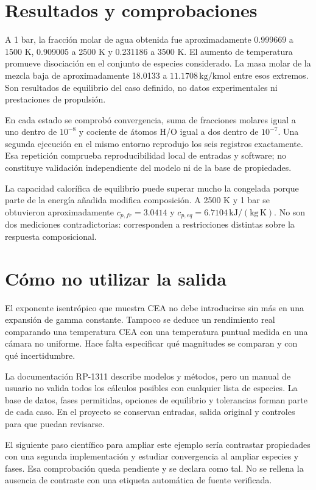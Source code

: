 \section{Resultados y comprobaciones}
A 1 bar, la fracción molar de agua obtenida fue aproximadamente 0.999669 a 1500 K, 0.909005 a 2500 K y 0.231186 a 3500 K. El aumento de temperatura promueve disociación en el conjunto de especies considerado. La masa molar de la mezcla baja de aproximadamente 18.0133 a $11.1708\,\mathrm{kg/kmol}$ entre esos extremos. Son resultados de equilibrio del caso definido, no datos experimentales ni prestaciones de propulsión.

En cada estado se comprobó convergencia, suma de fracciones molares igual a uno dentro de $10^{-8}$ y cociente de átomos H/O igual a dos dentro de $10^{-7}$. Una segunda ejecución en el mismo entorno reprodujo los seis registros exactamente. Esa repetición comprueba reproducibilidad local de entradas y software; no constituye validación independiente del modelo ni de la base de propiedades.

La capacidad calorífica de equilibrio puede superar mucho la congelada porque parte de la energía añadida modifica composición. A 2500 K y 1 bar se obtuvieron aproximadamente $c_{p,fr}=3.0414$ y $c_{p,eq}=6.7104\,\mathrm{kJ/(kg\,K)}$. No son dos mediciones contradictorias: corresponden a restricciones distintas sobre la respuesta composicional.
\section{Cómo no utilizar la salida}
El exponente isentrópico que muestra CEA no debe introducirse sin más en una expansión de gamma constante. Tampoco se deduce un rendimiento real comparando una temperatura CEA con una temperatura puntual medida en una cámara no uniforme. Hace falta especificar qué magnitudes se comparan y con qué incertidumbre.

La documentación RP-1311 describe modelos y métodos, pero un manual de usuario no valida todos los cálculos posibles con cualquier lista de especies. La base de datos, fases permitidas, opciones de equilibrio y tolerancias forman parte de cada caso. En el proyecto se conservan entradas, salida original y controles para que puedan revisarse.

El siguiente paso científico para ampliar este ejemplo sería contrastar propiedades con una segunda implementación y estudiar convergencia al ampliar especies y fases. Esa comprobación queda pendiente y se declara como tal. No se rellena la ausencia de contraste con una etiqueta automática de fuente verificada.
